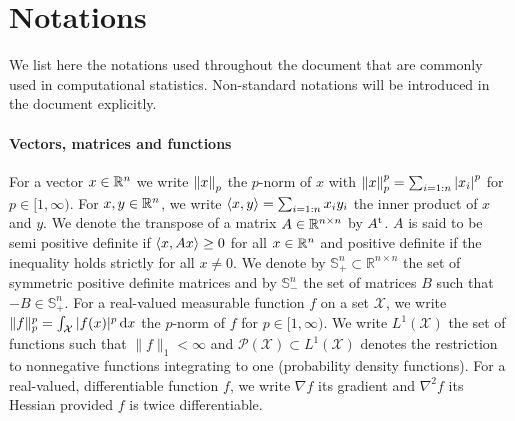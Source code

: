 
\chapter*{Notations}

We list here the notations used throughout the document that are commonly used in computational statistics. Non-standard notations will be introduced in the document explicitly.

\subsubsection{Vectors, matrices and functions} 
For a vector $x\in\mathbb R^{n}$ we write $\left\|x\right\|_{p}$ the $p$-norm of $x$ with $\left\|x\right\|_{p}^{p}=\sum_{i=1:n}\left|x_{i}\right|^{p}$ for $p\in[1,\infty)$. 
For $x,y\in\mathbb R^{n}$, we write $\left\langle x,y \right\rangle=\sum_{i=1:n}x_{i}y_{i}$ the inner product of $x$ and $y$. 
We denote the transpose of a matrix $A\in\mathbb R^{n\times n}$ by $A^\mathrm{t}$. $A$ is said to be semi positive definite if $\left\langle x,Ax \right\rangle\ge 0$ for all $x\in\mathbb R^{n}$ and positive definite if the inequality holds strictly for all $x\neq 0$. We denote by $\mathbb S_+^{n}\subset \mathbb R^{n\times n}$ the set of symmetric positive definite matrices and by $\mathbb S_-^{n}$ the set of matrices $B$ such that $-B\in\mathbb S_+^{n}$.
For a real-valued measurable function $f$ on a set $\mathcal X$, we write $\|f\|_{p}^{p}=\int_{\mathcal X} |f(x)|^{p}\,\mathrm{d} x$ the $p$-norm of $f$ for $p\in[1,\infty)$. 
We write $L^{1}(\mathcal X)$ the set of functions such that $\|f\|_{1}<\infty$ and $\mathcal P(\mathcal X) \subset L^{1}(\mathcal X)$ denotes the restriction to nonnegative functions integrating to one (probability density functions). 
For a real-valued, differentiable function $f$, we write $\nabla f$ its gradient and $\nabla^{2} f$ its Hessian provided $f$ is twice differentiable.

